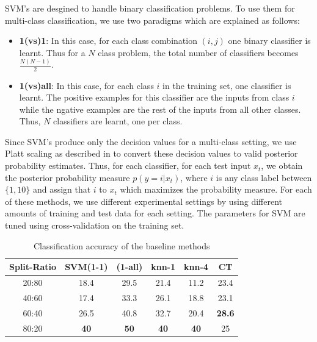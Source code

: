 \documentclass[10pt,twocolumn,letterpaper]{article}
\begin{document}
SVM's are desgined to handle binary classification problems. To use them for multi-class classification, we use two paradigms which are explained as follows:
\begin{itemize}
\item \textbf{1(vs)1}: In this case, for each class combination $(i,j)$ one binary classifier is learnt. Thus for a $N$ class problem, the total number of classifiers becomes $\frac{N(N-1)}{2}$. 

\item \textbf{1(vs)all}: In this case, for each class $i$ in the training set, one classifier is learnt. The positive examples for this classifier are the inputs from class $i$ while the ngative examples are the rest of the inputs from all other classes. Thus, $N$ classifiers are learnt, one per class. 
\end{itemize}

Since SVM's produce only the decision values for a multi-class setting, we use Platt scaling as described in \cite{Platt1999} to convert these decision values to valid posterior probability estimates. Thus, for each classifier, for each test input $x_t$, we obtain the posterior probability measure $p(y=i|x_t)$, where $i$ is any class label between $\{1,10\}$ and assign that $i$ to $x_t$ which maximizes the probability measure. For each of these methods, we use different experimental settings by using different amounts of training and test data for each setting. The parameters for SVM are tuned using cross-validation on the training set. 

\begin{table}[ht] 
\caption{Classification accuracy of the baseline methods} %
\centering %
\begin{tabular}{c c c c c c} %
\hline\hline %
Split-Ratio  & SVM(1-1) & (1-all) & knn-1 & knn-4 & CT\\ [0.5ex] %
\hline %
20:80 &	18.4	 & 29.5  & 21.4 & 11.2 & 23.4 \\
40:60 &	17.4 &	33.3 & 26.1	& 18.8 &	 23.1 \\
60:40 &	26.5	 & 40.8	 & 32.7	& 20.4 &	 \textbf{28.6} \\
80:20 &	\textbf{40}   &	\textbf{50}	 & \textbf{40}	& \textbf{40}	   & 25 \\  [1ex]
\hline %
\end{tabular} 
\label{table:acc} %
\end{table} 
\end{document}
